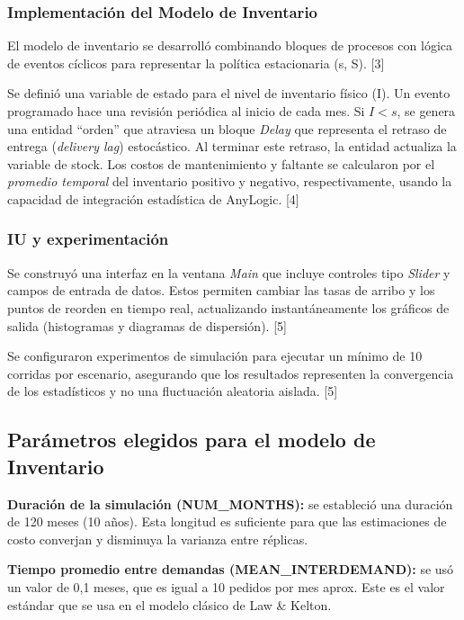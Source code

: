 \documentclass{article}
\begin{document}
\subsubsection{Implementación del Modelo de Inventario}
El modelo de inventario se desarrolló combinando bloques de procesos con lógica de eventos cíclicos para representar la política estacionaria (s, S). [3]

Se definió una variable de estado para el nivel de inventario físico (I). Un evento programado hace una revisión periódica al inicio de cada mes. Si $I < s$, se genera una entidad “orden” que atraviesa un bloque \textit{Delay} que representa el retraso de entrega (\textit{delivery lag}) estocástico. Al terminar este retraso, la entidad actualiza la variable de stock. Los costos de mantenimiento y faltante se calcularon por el \textit{promedio temporal} del inventario positivo y negativo, respectivamente, usando la capacidad de integración estadística de AnyLogic. [4]

\subsubsection{IU y experimentación}
Se construyó una interfaz en la ventana \textit{Main} que incluye controles tipo \textit{Slider} y campos de entrada de datos. Estos permiten cambiar las tasas de arribo y los puntos de reorden en tiempo real, actualizando instantáneamente los gráficos de salida (histogramas y diagramas de dispersión). [5]

Se configuraron experimentos de simulación para ejecutar un mínimo de 10 corridas por escenario, asegurando que los resultados representen la convergencia de los estadísticos y no una fluctuación aleatoria aislada. [5]



\subsection{Parámetros elegidos para el modelo de Inventario}

\textbf{Duración de la simulación (NUM\_MONTHS):} se estableció una duración de 120 meses (10 años). Esta longitud es suficiente para que las estimaciones de costo converjan y disminuya la varianza entre réplicas.

\textbf{Tiempo promedio entre demandas (MEAN\_INTERDEMAND):} se usó un valor de 0,1 meses, que es igual a 10 pedidos por mes aprox. Este es el valor estándar que se usa en el modelo clásico de Law \& Kelton.
\end{document}
